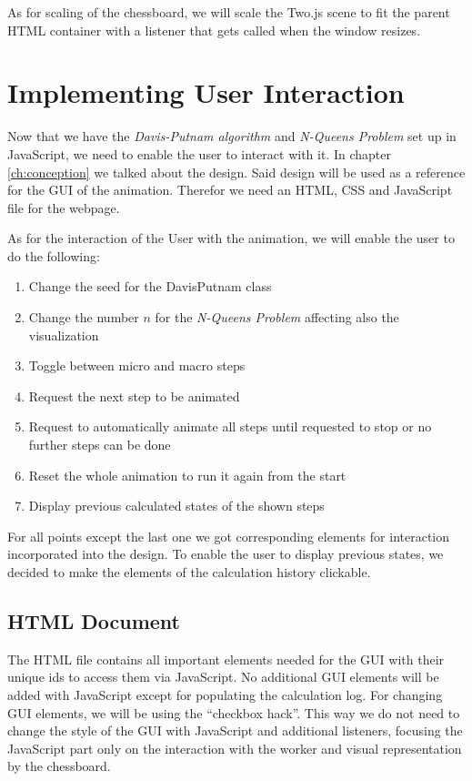 As for scaling of the chessboard, we will scale the Two.js scene to fit the parent HTML container with a listener that gets called when the window resizes.

\section{Implementing User Interaction}
\label{sec:impUI}
Now that we have the \textit{Davis-Putnam algorithm} and \textit{N-Queens Problem} set up in JavaScript, we need to enable the user to interact with it. In chapter \ref{ch:conception} we talked about the design. Said design will be used as a reference for the GUI of the animation. Therefor we need an HTML, CSS and JavaScript file for the webpage.

As for the interaction of the User with the animation, we will enable the user to do the following:

\begin{enumerate}
    \item Change the seed for the DavisPutnam class
    \item Change the number $n$ for the \textit{N-Queens Problem} affecting also the visualization
    \item Toggle between micro and macro steps
    \item Request the next step to be animated
    \item Request to automatically animate all steps until requested to stop or no further steps can be done
    \item Reset the whole animation to run it again from the start
    \item Display previous calculated states of the shown steps
\end{enumerate}

For all points except the last one we got corresponding elements for interaction incorporated into the design. To enable the user to display previous states, we decided to make the elements of the calculation history clickable.

\subsection{HTML Document}
\label{sub:impHTML}
The HTML file contains all important elements needed for the GUI with their unique ids to access them via JavaScript. No additional GUI elements will be added with JavaScript except for populating the calculation log. For changing GUI elements, we will be using the ``checkbox hack''. This way we do not need to change the style of the GUI with JavaScript and additional listeners, focusing the JavaScript part only on the interaction with the worker and visual representation by the chessboard.

